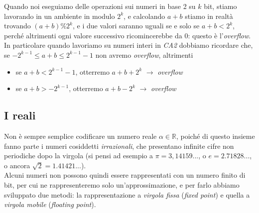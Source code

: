\documentclass[class=book, crop=false, oneside]{standalone}
\begin{document}
Quando noi eseguiamo delle operazioni sui numeri in base 2 su $k$ bit, stiamo lavorando in un ambiente in modulo $2^{k}$, e calcolando $a+b$ stiamo in realtà trovando $(a+b)\%2^{k}$, e i due valori saranno uguali se e solo se $a+b<2^{k}$, perché altrimenti ogni valore successivo ricomincerebbe da 0: questo è l'\emph{overflow}.\\
In particolare quando lavoriamo su numeri interi in \emph{CA2} dobbiamo ricordare che, se $-2^{k-1}\le a+b\le 2^{k-1}-1$ non avremo \emph{overflow}, altrimenti
\begin{itemize}[noitemsep,nolistsep]
	\item se $a+b<2^{k-1}-1$, otterremo $a+b+2^{k}$ $\longrightarrow$ \emph{overflow}
	\item se $a+b>-2^{k-1}$, otterremo $a+b-2^{k}$ $\longrightarrow$ \emph{overflow}
\end{itemize}

\subsection{I reali} Non è sempre semplice codificare un numero reale $\alpha \in \mathbb{R}$, poiché di questo insieme fanno parte i numeri cosiddetti \emph{irrazionali}, che presentano infinite cifre non periodiche dopo la virgola (si pensi ad esempio a $\pi=3,14159...$, o $e=2.71828...$, o ancora $\sqrt{2}=1.41421...$).\\
Alcuni numeri non possono quindi essere rappresentati con un numero finito di bit, per cui ne rappresenteremo solo un'approssimazione, e per farlo abbiamo sviluppato due metodi: la rappresentazione a \emph{virgola fissa} (\emph{fixed point}) e quella a \emph{virgola mobile} (\emph{floating point}).
\end{document}
